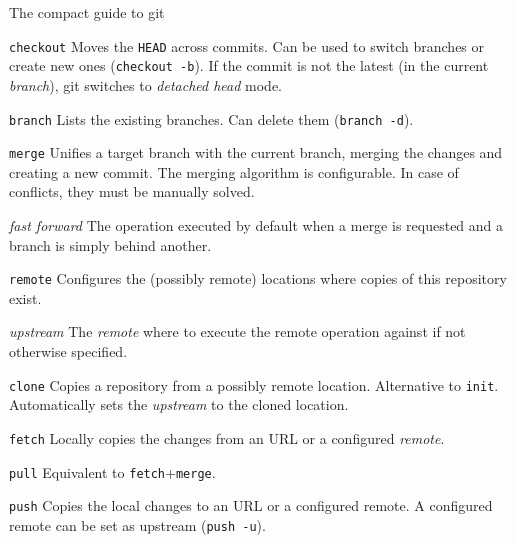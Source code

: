 \documentclass[presentation]{beamer}
\begin{document}
\begin{frame}{The compact guide to git}
	\begin{block}{\texttt{checkout}}
		Moves the \texttt{HEAD} across commits.
		Can be used to switch branches or create new ones (\texttt{checkout -b}).
		If the commit is not the latest (in the current \textit{branch}), git switches to \textit{detached head} mode.
	\end{block}
	\begin{block}{\texttt{branch}}
		Lists the existing branches. Can delete them (\texttt{branch -d}).
	\end{block}
	\begin{block}{\texttt{merge}}
		Unifies a target branch with the current branch, merging the changes and creating a new commit.
		The merging algorithm is configurable.
		In case of conflicts, they must be manually solved.
	\end{block}
	\begin{block}{\textit{fast forward}}
		The operation executed by default when a merge is requested and a branch is simply behind another.
	\end{block}
	\begin{block}{\texttt{remote}}
		Configures the (possibly remote) locations where copies of this repository exist.
	\end{block}
	\begin{block}{\textit{upstream}}
		The \textit{remote} where to execute the remote operation against if not otherwise specified.
	\end{block}
	\begin{block}{\texttt{clone}}
		Copies a repository from a possibly remote location.
		Alternative to \texttt{init}.
		Automatically sets the \textit{upstream} to the cloned location.
	\end{block}
	\begin{block}{\texttt{fetch}}
		Locally copies the changes from an URL or a configured \textit{remote}.
	\end{block}
	\begin{block}{\texttt{pull}}
		Equivalent to \texttt{fetch}+\texttt{merge}.
	\end{block}
	\begin{block}{\texttt{push}}
		Copies the local changes to an URL or a configured remote.
		A configured remote can be set as upstream (\texttt{push -u}).
	\end{block}
\end{frame}
\end{document}
